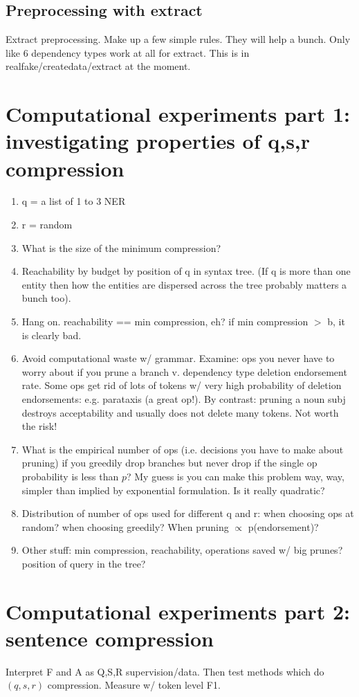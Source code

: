 \documentclass[11pt,a4paper]{article}
\begin{document}
\subsection{Preprocessing with extract}
Extract preprocessing. Make up a few simple rules. They will help a bunch. Only like 6 dependency types work at all for extract. This is in realfake/createdata/extract at the moment.

\section{Computational experiments part 1: investigating properties of q,s,r compression}
\begin{enumerate}
\item{q = a list of 1 to 3 NER}
\item{r = random}
\item{What is the size of the minimum compression?}
\item{Reachability by budget by position of q in syntax tree. (If q is more than one entity then how the entities are dispersed across the tree probably matters a bunch too).}
\item{Hang on. reachability == min compression, eh? if min compression $>$ b, it is clearly bad.}
\item{Avoid computational waste w/ grammar.  Examine: ops you never have to worry about if you prune a branch v. dependency type deletion endorsement rate. Some ops get rid of lots of tokens w/ very high probability of deletion endorsements: e.g. parataxis (a great op!). By contrast: pruning a noun subj destroys acceptability and usually does not delete many tokens. Not worth the risk!}
\item{What is the empirical number of ops (i.e. decisions you have to make about pruning) if you greedily drop branches but never drop if the single op probability is less than $p$? My guess is you can make this problem way, way, simpler than implied by exponential formulation. Is it really quadratic?}
\item{Distribution of number of ops used for different q and r: when choosing ops at random? when choosing greedily? When pruning $\propto$ p(endorsement)?}
\item{Other stuff: min compression, reachability, operations saved w/ big prunes? position of query in the tree?}
\end{enumerate}

\section{Computational experiments part 2: sentence compression}
Interpret F and A as Q,S,R supervision/data. Then test methods which do $(q,s,r)$ compression. Measure w/ token level F1.
\end{document}

